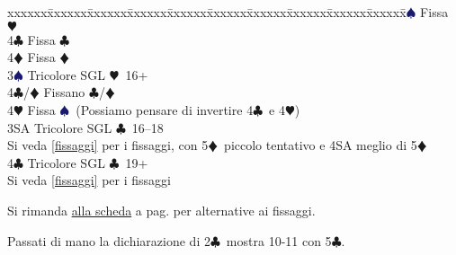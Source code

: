 \documentclass[a4paper,italian]{article}
\newcommand{\BC}{\textcolor{OliveGreen}{$\clubsuit$}}
\newcommand{\BD}{\textcolor{RedOrange}{$\vardiamondsuit$}}
\newcommand{\BH}{\textcolor{Red2}{$\varheartsuit${}}}
\newcommand{\BS}{\textcolor{MidnightBlue}{$\spadesuit${}}}
\newenvironment{bidtable}
{\begin{tabbing}

    xxxxxx\=xxxxxx\=xxxxxx\=xxxxxx\=xxxxxx\=xxxxxx\=xxxxxx\=xxxxxx\=xxxxxx\=xxxxxx\=\kill}
{\end{tabbing} }%
\begin{document}
\begin{bidtable}
                                        3\BS \> Fissa \BH \\
                                        4\BC \> Fissa \BC \\
                                        4\BD \> Fissa \BD \-\\
                                        3\BS \> Tricolore SGL \BH\ 16+\+\\
                                        4\BC/\BD \> Fissano \BC /\BD \\
                                        4\BH \> Fissa \BS\ (Possiamo pensare di invertire 4\BC\ e 4\BH )\-\\
                                        3SA \> Tricolore SGL \BC\ 16--18\+\\
                                        Si veda \ref{fissaggi} per i fissaggi, con 5\BD\ piccolo tentativo e 4SA meglio di 5\BD\-\\
                                        4\BC \> Tricolore SGL \BC\ 19+\+\\
                                        Si veda \ref{fissaggi} per i fissaggi\-\-
                                    \end{bidtable}
                                    \bigbreak
                                    Si rimanda \hyperref[fissaggi]{alla scheda} a pag. \pageref{fissaggi} per alternative ai fissaggi.

                                    Passati di mano la dichiarazione di 2\BC\ mostra 10-11 con 5\BC .
\end{document}
